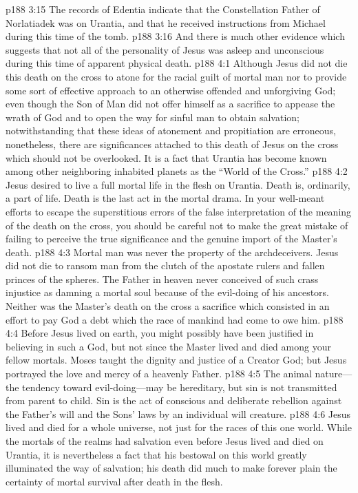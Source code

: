 \vs p188 3:15 The records of Edentia indicate that the Constellation Father of Norlatiadek was on Urantia, and that he received instructions from Michael during this time of the tomb.
\vs p188 3:16 And there is much other evidence which suggests that not all of the personality of Jesus was asleep and unconscious during this time of apparent physical death.
\vs p188 4:1 Although Jesus did not die this death on the cross to atone for the racial guilt of mortal man nor to provide some sort of effective approach to an otherwise offended and unforgiving God; even though the Son of Man did not offer himself as a sacrifice to appease the wrath of God and to open the way for sinful man to obtain salvation; notwithstanding that these ideas of atonement and propitiation are erroneous, nonetheless, there are significances attached to this death of Jesus on the cross which should not be overlooked. It is a fact that Urantia has become known among other neighboring inhabited planets as the “World of the Cross.”
\vs p188 4:2 Jesus desired to live a full mortal life in the flesh on Urantia. Death is, ordinarily, a part of life. Death is the last act in the mortal drama. In your well\hyp{}meant efforts to escape the superstitious errors of the false interpretation of the meaning of the death on the cross, you should be careful not to make the great mistake of failing to perceive the true significance and the genuine import of the Master’s death.
\pc \vs p188 4:3 Mortal man was never the property of the archdeceivers. Jesus did not die to ransom man from the clutch of the apostate rulers and fallen princes of the spheres. The Father in heaven never conceived of such crass injustice as damning a mortal soul because of the evil\hyp{}doing of his ancestors. Neither was the Master’s death on the cross a sacrifice which consisted in an effort to pay God a debt which the race of mankind had come to owe him.
\vs p188 4:4 Before Jesus lived on earth, you might possibly have been justified in believing in such a God, but not since the Master lived and died among your fellow mortals. Moses taught the dignity and justice of a Creator God; but Jesus portrayed the love and mercy of a heavenly Father.
\vs p188 4:5 The animal nature---the tendency toward evil\hyp{}doing---may be hereditary, but sin is not transmitted from parent to child. Sin is the act of conscious and deliberate rebellion against the Father’s will and the Sons’ laws by an individual will creature.
\vs p188 4:6 Jesus lived and died for a whole universe, not just for the races of this one world. While the mortals of the realms had salvation even before Jesus lived and died on Urantia, it is nevertheless a fact that his bestowal on this world greatly illuminated the way of salvation; his death did much to make forever plain the certainty of mortal survival after death in the flesh.
